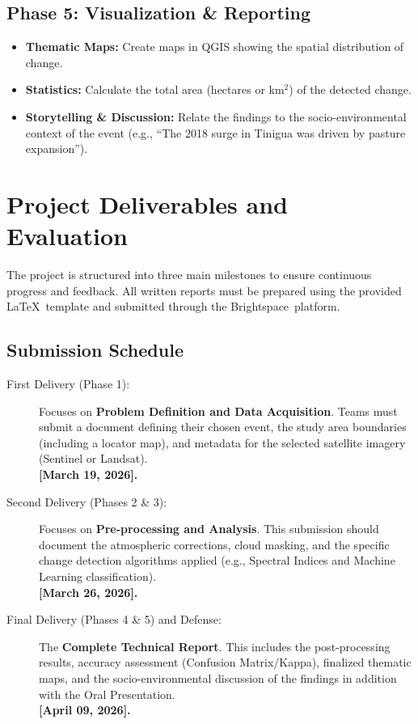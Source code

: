 \documentclass{article}
\begin{document}
\subsection*{Phase 5: Visualization \& Reporting}
\begin{itemize}
    \item \textbf{Thematic Maps:} Create maps in QGIS showing the spatial distribution of change.
    \item \textbf{Statistics:} Calculate the total area (hectares or km$^2$) of the detected change.
    \item \textbf{Storytelling \& Discussion:} Relate the findings to the socio-environmental context of the event (e.g., ``The 2018 surge in Tinigua was driven by pasture expansion'').
\end{itemize}

\section{Project Deliverables and Evaluation}

The project is structured into three main milestones to ensure continuous progress and feedback. All written reports must be prepared using the provided \LaTeX\ template and submitted through the Brightspace\texttrademark\ platform.

\subsection*{Submission Schedule}

\begin{description}
    \item[First Delivery (Phase 1):] Focuses on \textbf{Problem Definition and Data Acquisition}. Teams must submit a document defining their chosen event, the study area boundaries (including a locator map), and metadata for the selected satellite imagery (Sentinel or Landsat).  \\
    \textbf{[March 19, 2026].}

    \item[Second Delivery (Phases 2 \& 3):] Focuses on \textbf{Pre-processing and Analysis}. This submission should document the atmospheric corrections, cloud masking, and the specific change detection algorithms applied (e.g., Spectral Indices and Machine Learning classification). \\
    \textbf{[March 26, 2026].}


    \item[Final Delivery (Phases 4 \& 5) and Defense:] The \textbf{Complete Technical Report}. This includes the post-processing results, accuracy assessment (Confusion Matrix/Kappa), finalized thematic maps, and the socio-environmental discussion of the findings in addition with the Oral Presentation. \\
    \textbf{[April 09, 2026].}

\end{description}
\end{document}
